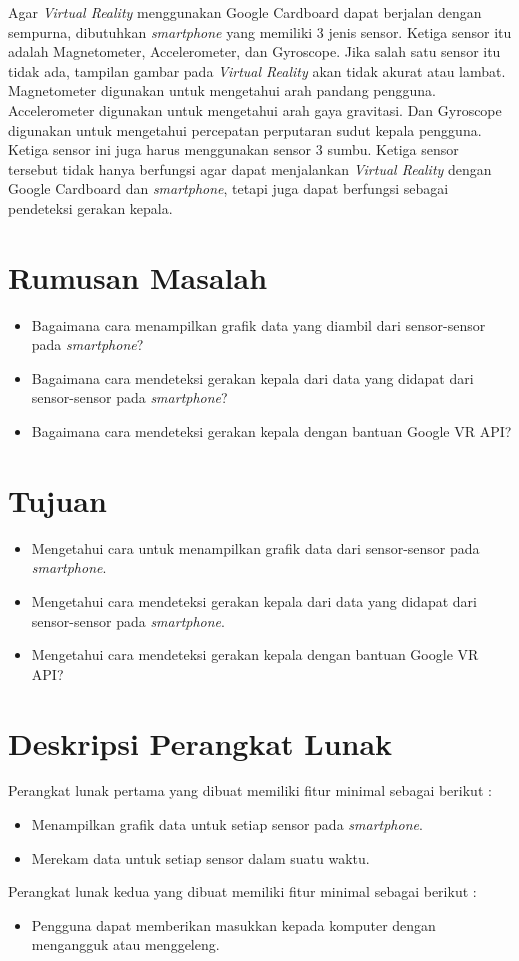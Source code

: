 \documentclass[a4paper,twoside]{article}
\begin{document}
Agar \textit{Virtual Reality} menggunakan Google Cardboard dapat berjalan dengan sempurna, dibutuhkan \textit{smartphone} yang memiliki 3 jenis sensor. Ketiga sensor itu adalah Magnetometer, Accelerometer, dan Gyroscope. Jika salah satu sensor itu tidak ada, tampilan gambar pada \textit{Virtual Reality} akan tidak akurat atau lambat. Magnetometer digunakan untuk mengetahui arah pandang pengguna. Accelerometer digunakan untuk mengetahui arah gaya gravitasi. Dan Gyroscope digunakan untuk mengetahui percepatan perputaran sudut kepala pengguna. Ketiga sensor ini juga harus menggunakan sensor 3 sumbu. Ketiga sensor tersebut tidak hanya berfungsi agar dapat menjalankan \textit{Virtual Reality} dengan Google Cardboard dan \textit{smartphone}, tetapi juga dapat berfungsi sebagai pendeteksi gerakan kepala.

\section{Rumusan Masalah}

\begin{itemize}
	\item Bagaimana cara menampilkan grafik data yang diambil dari sensor-sensor pada \textit{smartphone}?
	\item Bagaimana cara mendeteksi gerakan kepala dari data yang didapat dari sensor-sensor pada \textit{smartphone}?
	\item Bagaimana cara mendeteksi gerakan kepala dengan bantuan Google VR API?
\end{itemize}

\section{Tujuan}

\begin{itemize}
	\item Mengetahui cara untuk menampilkan grafik data dari sensor-sensor pada \textit{smartphone}.
	\item Mengetahui cara mendeteksi gerakan kepala dari data yang didapat dari sensor-sensor pada \textit{smartphone}.
	\item Mengetahui cara mendeteksi gerakan kepala dengan bantuan Google VR API?
\end{itemize}
\section{Deskripsi Perangkat Lunak}
Perangkat lunak pertama yang dibuat memiliki fitur minimal sebagai berikut :
\begin{itemize}
\item	Menampilkan grafik data untuk setiap sensor pada \textit{smartphone}.
\item	Merekam data untuk setiap sensor dalam suatu waktu.
\end{itemize}
Perangkat lunak kedua yang dibuat memiliki fitur minimal sebagai berikut :
\begin{itemize}
\item	Pengguna dapat memberikan masukkan kepada komputer dengan mengangguk atau menggeleng.
\end{itemize}
\end{document}
